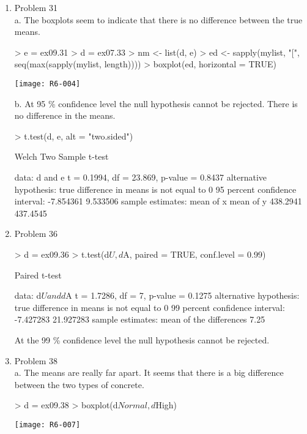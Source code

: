 \documentclass[11pt,letterpaper]{article}
\begin{document}
\begin{enumerate}
\item Problem 31\\
a. The boxplots seem to indicate that there is no difference between the true means. 
\begin{Schunk}
\begin{Sinput}
> e = ex09.31
> d = ex07.33
> nm <- list(d, e)
> ed <- sapply(mylist, "[", seq(max(sapply(mylist, length))))
> boxplot(ed, horizontal = TRUE)
\end{Sinput}
\end{Schunk}
\texttt{[image: R6-004]}

b. At 95 \% confidence level the null hypothesis cannot be rejected. There is no difference in the means.
\begin{Schunk}
\begin{Sinput}
> t.test(d, e, alt = "two.sided")
\end{Sinput}
\begin{Soutput}
	Welch Two Sample t-test

data:  d and e 
t = 0.1994, df = 23.869, p-value = 0.8437
alternative hypothesis: true difference in means is not equal to 0 
95 percent confidence interval:
 -7.854361  9.533506 
sample estimates:
mean of x mean of y 
 438.2941  437.4545 
\end{Soutput}
\end{Schunk}

\item Problem 36\\
\begin{Schunk}
\begin{Sinput}
> d = ex09.36
> t.test(d$U, d$A, paired = TRUE, conf.level = 0.99)
\end{Sinput}
\begin{Soutput}
	Paired t-test

data:  d$U and d$A 
t = 1.7286, df = 7, p-value = 0.1275
alternative hypothesis: true difference in means is not equal to 0 
99 percent confidence interval:
 -7.427283 21.927283 
sample estimates:
mean of the differences 
                   7.25 
\end{Soutput}
\end{Schunk}
At the 99 \% confidence level the null hypothesis cannot be rejected.

\item Problem 38\\
a. The means are really far apart. It seems that there is a big difference between the two types of concrete.
\begin{Schunk}
\begin{Sinput}
> d = ex09.38
> boxplot(d$Normal, d$High)
\end{Sinput}
\end{Schunk}
\texttt{[image: R6-007]}


\end{enumerate}
\end{document}
